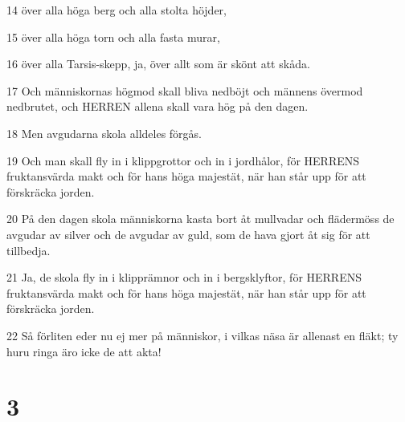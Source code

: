 \par 14 över alla höga berg och alla stolta höjder,
\par 15 över alla höga torn och alla fasta murar,
\par 16 över alla Tarsis-skepp, ja, över allt som är skönt att skåda.
\par 17 Och människornas högmod skall bliva nedböjt och männens övermod nedbrutet, och HERREN allena skall vara hög på den dagen.
\par 18 Men avgudarna skola alldeles förgås.
\par 19 Och man skall fly in i klippgrottor och in i jordhålor, för HERRENS fruktansvärda makt och för hans höga majestät, när han står upp för att förskräcka jorden.
\par 20 På den dagen skola människorna kasta bort åt mullvadar och flädermöss de avgudar av silver och de avgudar av guld, som de hava gjort åt sig för att tillbedja.
\par 21 Ja, de skola fly in i klipprämnor och in i bergsklyftor, för HERRENS fruktansvärda makt och för hans höga majestät, när han står upp för att förskräcka jorden.
\par 22 Så förliten eder nu ej mer på människor, i vilkas näsa är allenast en fläkt; ty huru ringa äro icke de att akta!

\chapter{3}

